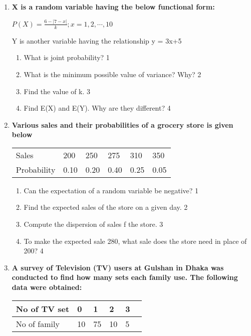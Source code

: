 \documentclass[a4paper,oneside, margin=1.4in]{book}
\begin{document}
\begin{enumerate}
       \item
	  \textbf{X is a random variable having the below functional form:} 
  
  \begin{center}
  $P(X) = \frac{6-|7-x|}{k}; x = 1, 2, \cdots,10$ \\
  \end{center}  
  
  Y is another variable having the relationship y = 3x+5
  
  \begin{enumerate}
    \item
	What is joint probability? \hfill 1
    \item
	What is the minimum possible value of variance? Why? \hfill 2
    \item  
	Find the value of k. \hfill 3
    \item
	Find E(X) and E(Y). Why are they different? \hfill 4
  \end{enumerate}
  
       \item
  \textbf{Various sales and their probabilities of a grocery store is given below}
  
  \begin{table}[h]
  \centering
\begin{tabular}{llllll}
Sales & 200 & 250 & 275 & 310 & 350 \\
Probability & 0.10 & 0.20 & 0.40 & 0.25 & 0.05
\end{tabular}
\end{table}

  \begin{enumerate}
    \item
	Can the expectation of a random variable be negative? \hfill 1
    \item
    	Find the expected sales of the store on a given day. \hfill 2
    \item
    	Compute the dispersion of sales f the store. \hfill 3
     \item
     	To make the expected sale 280, what sale does the store need in place of 200? \hfill 4
  \end{enumerate}
  
     \item
	  \textbf{A survey of Television (TV) users at Gulshan in Dhaka was conducted to find how many sets each family use. The following data were obtained:} 
	  
	  	  \begin{table}[h]
	  \begin{center}
\begin{tabular}{llllll}
No of TV set    & 0 & 1  & 2 & 3    \\ \hline
No of family & 10 & 75 & 10 & 5
\end{tabular}
\end{center}	
\end{table}
  

\end{enumerate}
\end{document}
